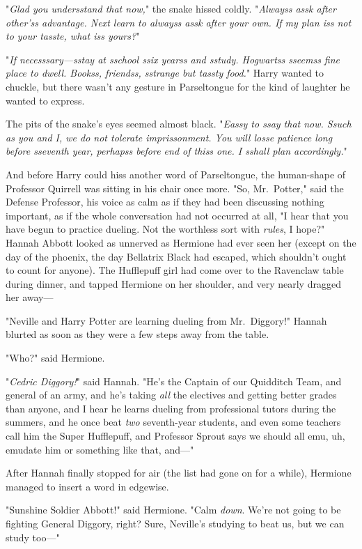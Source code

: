 "\emph{Glad you undersstand that now,}" the snake hissed coldly. "\emph{Alwayss assk after other'ss advantage. Next learn to alwayss assk after your own. If my plan iss not to your tasste, what iss yours?}"

"\emph{If necesssary---sstay at sschool ssix yearss and sstudy. Hogwartss sseemss fine place to dwell. Bookss, friendss, sstrange but tassty food.}" Harry wanted to chuckle, but there wasn't any gesture in Parseltongue for the kind of laughter he wanted to express.

The pits of the snake's eyes seemed almost black. "\emph{Eassy to ssay that now. Ssuch as you and I, we do not tolerate imprissonment. You will losse patience long before sseventh year, perhapss before end of thiss one. I sshall plan accordingly.}"

And before Harry could hiss another word of Parseltongue, the human-shape of Professor Quirrell was sitting in his chair once more. "So, Mr.~Potter," said the Defense Professor, his voice as calm as if they had been discussing nothing important, as if the whole conversation had not occurred at all, "I hear that you have begun to practice dueling. Not the worthless sort with \emph{rules}, I hope?"
\sbreak
Hannah Abbott looked as unnerved as Hermione had ever seen her (except on the day of the phoenix, the day Bellatrix Black had escaped, which shouldn't ought to count for anyone). The Hufflepuff girl had come over to the Ravenclaw table during dinner, and tapped Hermione on her shoulder, and very nearly dragged her away---

"Neville and Harry Potter are learning dueling from Mr.~Diggory!" Hannah blurted as soon as they were a few steps away from the table.

"Who?" said Hermione.

"\emph{Cedric Diggory!}" said Hannah. "He's the Captain of our Quidditch Team, and general of an army, and he's taking \emph{all} the electives and getting better grades than anyone, and I hear he learns dueling from professional tutors during the summers, and he once beat \emph{two} seventh-year students, and even some teachers call him the Super Hufflepuff, and Professor Sprout says we should all emu, uh, emudate him or something like that, and---"

After Hannah finally stopped for air (the list had gone on for a while), Hermione managed to insert a word in edgewise.

"Sunshine Soldier Abbott!" said Hermione. "Calm \emph{down}. We're not going to be fighting General Diggory, right? Sure, Neville's studying to beat us, but we can study too---"

